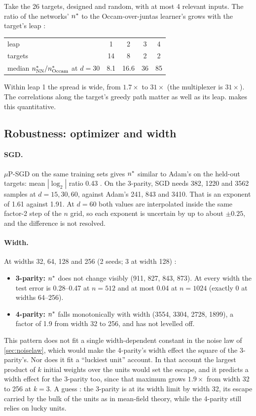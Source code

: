 Take the 26 targets, designed and random, with at most 4 relevant inputs. The ratio of the networks' $n^{*}$ to the Occam-over-juntas learner's grows with the target's leap :

\begin{center}\small
\begin{tabular}{lcccc}
\toprule
leap & 1 & 2 & 3 & 4\\
targets & 14 & 8 & 2 & 2\\
median $n^{*}_{\rm NN}/n^{*}_{\rm Occam}$ at $d=30$ & 8.1 & 16.6 & 36 & 85\\
\bottomrule
\end{tabular}
\end{center}
Within leap 1 the spread is wide, from $1.7\times$ to $31\times$ (the multiplexer is $31\times$). The correlations along the target's greedy path matter as well as its leap.  makes this quantitative.

\subsection{Robustness: optimizer and width}\label{sec:width}

\paragraph{SGD.} $\mu$P-SGD on the same training sets gives $n^{*}$ similar to Adam's on the held-out targets: mean $|\log_2|$ ratio 0.43 . On the 3-parity, SGD needs 382, 1220 and 3562 samples at $d=15,30,60$, against Adam's 241, 843 and 3410. That is an exponent of 1.61 against 1.91. At $d=60$ both values are interpolated inside the same factor-2 step of the $n$ grid, so each exponent is uncertain by up to about $\pm0.25$, and the difference is not resolved.

\paragraph{Width.} At widths 32, 64, 128 and 256 (2 seeds; 3 at width 128) :
\begin{itemize}
\item \textbf{3-parity:} $n^{*}$ does not change visibly (911, 827, 843, 873). At every width the test error is 0.28–0.47 at $n=512$ and at most 0.04 at $n=1024$ (exactly 0 at widths 64–256).
\item \textbf{4-parity:} $n^{*}$ falls monotonically with width (3554, 3304, 2728, 1899), a factor of 1.9 from width 32 to 256, and has not levelled off.
\end{itemize}
This pattern does not fit a single width-dependent constant in the noise law of \cref{sec:noiselaw}, which would make the 4-parity's width effect the square of the 3-parity's. Nor does it fit a ``luckiest unit'' account. In that account the largest product of $k$ initial weights over the units would set the escape, and it predicts a width effect for the 3-parity too, since that maximum grows $1.9\times$ from width 32 to 256 at $k=3$. A guess : the 3-parity is at its width limit by width 32, its escape carried by the bulk of the units as in mean-field theory, while the 4-parity still relies on lucky units.
